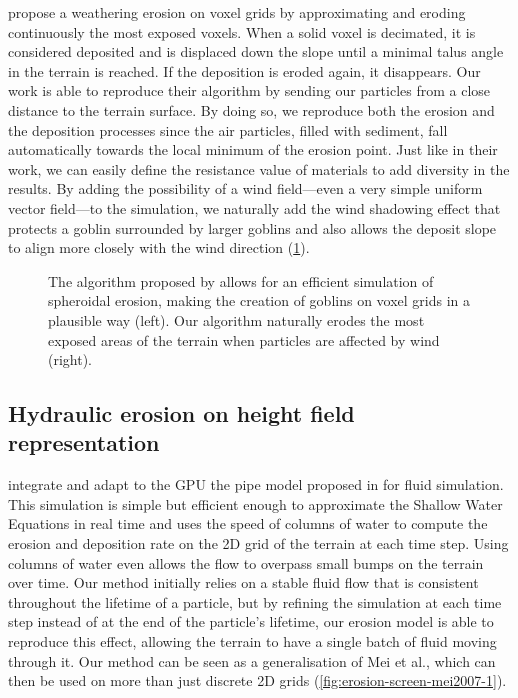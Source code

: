 \citep{Jones2010} propose a weathering erosion on voxel grids by approximating and eroding continuously the most exposed voxels. When a solid voxel is decimated, it is considered deposited and is displaced down the slope until a minimal talus angle in the terrain is reached. If the deposition is eroded again, it disappears. Our work is able to reproduce their algorithm by sending our particles from a close distance to the terrain surface. By doing so, we reproduce both the erosion and the deposition processes since the air particles, filled with sediment, fall automatically towards the local minimum of the erosion point. Just like in their work, we can easily define the resistance value of materials to add diversity in the results. By adding the possibility of a wind field—even a very simple uniform vector field—to the simulation, we naturally add the wind shadowing effect that protects a goblin surrounded by larger goblins and also allows the deposit slope to align more closely with the wind direction (\cref{fig:erosion-screen-jones2010}).

\begin{figure}
    \centering
    \caption{The algorithm proposed by \cite{Jones2010} allows for an efficient simulation of spheroidal erosion, making the creation of goblins on voxel grids in a plausible way (left). Our algorithm naturally erodes the most exposed areas of the terrain when particles are affected by wind (right).}
    \label{fig:erosion-screen-jones2010}
\end{figure}

\subsection{Hydraulic erosion on height field representation}

\citep{Mei2007} integrate and adapt to the GPU the pipe model proposed in \cite{OBrien1995} for fluid simulation. This simulation is simple but efficient enough to approximate the Shallow Water Equations in real time and uses the speed of columns of water to compute the erosion and deposition rate on the 2D grid of the terrain at each time step. Using columns of water even allows the flow to overpass small bumps on the terrain over time. Our method initially relies on a stable fluid flow that is consistent throughout the lifetime of a particle, but by refining the simulation at each time step instead of at the end of the particle’s lifetime, our erosion model is able to reproduce this effect, allowing the terrain to have a single batch of fluid moving through it. Our method can be seen as a generalisation of Mei et al., which can then be used on more than just discrete 2D grids (\cref{fig:erosion-screen-mei2007-1}). 

